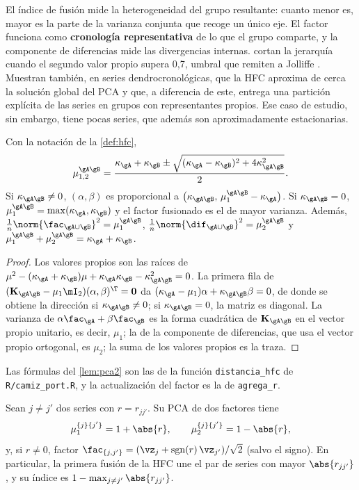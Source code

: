 El índice de fusión mide la heterogeneidad del grupo resultante: cuanto menor es, mayor es la
parte de la varianza conjunta que recoge un único eje. El factor funciona como \textbf{cronología
representativa} de lo que el grupo comparte, y la componente de diferencias mide las divergencias
internas. \textcite{camiz_et_al_2020} cortan la jerarquía cuando el segundo valor propio supera
0,7, umbral que remiten a Jolliffe \parencite[2002, como se cita en][]{camiz_et_al_2020}. Muestran
también, en series dendrocronológicas, que la HFC aproxima de cerca la solución global del PCA y
que, a diferencia de este, entrega una partición explícita de las series en grupos con
representantes propios. Ese caso de estudio, sin embargo, tiene pocas series, que además son
aproximadamente estacionarias.

\begin{lema}\label{lem:pca2}
Con la notación de la \cref{def:hfc},
\[
  \mu_{1,2}^{\gA\gB}=\frac{\kappa_{\gA}+\kappa_{\gB}\pm
  \sqrt{(\kappa_{\gA}-\kappa_{\gB})^2+4\kappa_{\gA\gB}^2}}{2}.
\]
Si $\kappa_{\gA\gB}\ne0$, $(\alpha,\beta)$ es proporcional a
$\bigl(\kappa_{\gA\gB},\,\mu_1^{\gA\gB}-\kappa_{\gA}\bigr)$. Si $\kappa_{\gA\gB}=0$,
$\mu_1^{\gA\gB}=\max(\kappa_{\gA},\kappa_{\gB})$ y el factor fusionado es el de mayor varianza.
Además, $\frac1n\norm{\fac_{\gA\cup\gB}}^2=\mu_1^{\gA\gB}$,
$\frac1n\norm{\dif_{\gA\cup\gB}}^2=\mu_2^{\gA\gB}$ y $\mu_1^{\gA\gB}+\mu_2^{\gA\gB}=\kappa_{\gA}+
\kappa_{\gB}$.
\end{lema}

\begin{proof}
Los valores propios son las raíces de
$\mu^2-(\kappa_{\gA}+\kappa_{\gB})\mu+\kappa_{\gA}\kappa_{\gB}-\kappa_{\gA\gB}^2=0$. La primera
fila de $(\mathbf{K}_{\gA\gB}-\mu_1\mI_2)(\alpha,\beta)^{\T}=\mathbf{0}$ da $(\kappa_{\gA}-\mu_1)\alpha+\kappa_{\gA\gB}\beta=0$, de donde se obtiene
la dirección si $\kappa_{\gA\gB}\ne0$; si $\kappa_{\gA\gB}=0$, la matriz es diagonal. La varianza de
$\alpha\fac_{\gA}+\beta\fac_{\gB}$ es la forma cuadrática de $\mathbf{K}_{\gA\gB}$ en el vector propio
unitario, es decir, $\mu_1$; la de la componente de diferencias, que usa el vector propio
ortogonal, es $\mu_2$; la suma de los valores propios es la traza.
\end{proof}

Las fórmulas del \cref{lem:pca2} son las de la función \texttt{distancia\_hfc} de
\texttt{R/camiz\_port.R}, y la actualización del factor es la de \texttt{agrega\_r}.

\begin{proposicion}\label{prop:hfc-hojas}
Sean $j\ne j'$ dos series con $r=r_{jj'}$. Su PCA de dos factores tiene
\[
  \mu_1^{\{j\}\{j'\}}=1+\abs{r},\qquad\mu_2^{\{j\}\{j'\}}=1-\abs{r},
\]
y, si $r\ne0$, factor $\fac_{\{j,j'\}}=(\vz_j+\operatorname{sgn}(r)\,\vz_{j'})/\sqrt2$ (salvo el
signo). En particular, la primera fusión de la HFC une el par de series con mayor
$\abs{r_{jj'}}$, y su índice es $1-\max_{j\ne j'}\abs{r_{jj'}}$.
\end{proposicion}

